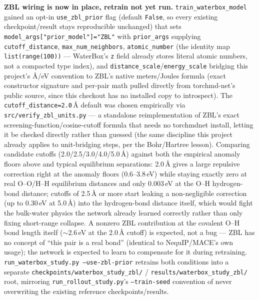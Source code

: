 \documentclass[11pt]{article}
\begin{document}
\textbf{ZBL wiring is now in place, retrain not yet run.}
\texttt{train\_waterbox\_model} gained an opt-in \texttt{use\_zbl\_prior} flag
(default \texttt{False}, so every existing checkpoint/result stays
reproducible unchanged) that sets \texttt{model\_args["prior\_model"]="ZBL"}
with \texttt{prior\_args} supplying \texttt{cutoff\_distance},
\texttt{max\_num\_neighbors}, \texttt{atomic\_number} (the identity map
\texttt{list(range(100))} --- WaterBox's \texttt{z} field already stores
literal atomic numbers, not a compacted type index), and
\texttt{distance\_scale}/\texttt{energy\_scale} bridging this project's
\AA/eV convention to ZBL's native meters/Joules formula (exact constructor
signature and per-pair math pulled directly from torchmd-net's public
source, since this checkout has no installed copy to introspect). The
\texttt{cutoff\_distance=2.0}\,\AA{} default was chosen empirically via
\texttt{src/verify\_zbl\_units.py} --- a standalone reimplementation of
ZBL's exact screening-function/cosine-cutoff formula that needs no
torchmdnet install, letting it be checked directly rather than guessed (the
same discipline this project already applies to unit-bridging steps, per
the Bohr/Hartree lesson). Comparing candidate cutoffs
(2.0/2.5/3.0/4.0/5.0\,\AA) against both the empirical anomaly floors above
and typical equilibrium separations: 2.0\,\AA{} gives a large repulsive
correction right at the anomaly floors (0.6--3.8\,eV) while staying exactly
zero at real O--O/H--H equilibrium distances and only 0.003\,eV at the O--H
hydrogen-bond distance; cutoffs of 2.5\,\AA{} or more start leaking a
non-negligible correction (up to 0.30\,eV at 5.0\,\AA) into the
hydrogen-bond distance itself, which would fight the bulk-water physics the
network already learned correctly rather than only fixing short-range
collapse. A nonzero ZBL contribution at the covalent O--H bond length itself
($\sim$2.6\,eV at the 2.0\,\AA{} cutoff) is expected, not a bug --- ZBL has no
concept of ``this pair is a real bond'' (identical to NequIP/MACE's own
usage); the network is expected to learn to compensate for it during
retraining. \texttt{run\_waterbox\_study.py --use-zbl-prior} retrains both
conditions into a separate \texttt{checkpoints/waterbox\_study\_zbl/} /
\texttt{results/waterbox\_study\_zbl/} root, mirroring
\texttt{run\_rollout\_study.py}'s \texttt{--train-seed} convention of never
overwriting the existing reference checkpoints/results.
\end{document}
